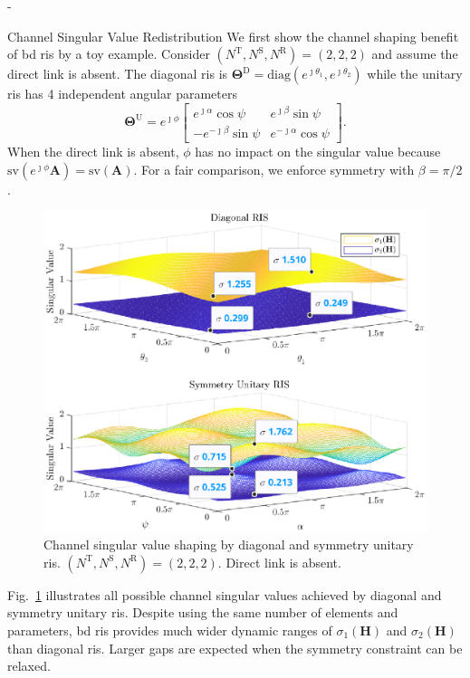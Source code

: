 \documentclass[journal]{IEEEtran}
\begin{document}
\begin{section}{-}

	\begin{subsection}{Channel Singular Value Redistribution}
		We first show the channel shaping benefit of \gls{bd} \gls{ris} by a toy example.
		Consider $(N^\mathrm{T}, N^\mathrm{S}, N^\mathrm{R}) = (2, 2, 2)$ and assume the direct link is absent.
		The diagonal \gls{ris} is $\mathbf{\Theta}^\mathrm{D} = \mathrm{diag}(e^{\jmath \theta_1}, e^{\jmath \theta_2})$ while the unitary \gls{ris} has 4 independent angular parameters
		\begin{equation}
			\mathbf{\Theta}^\mathrm{U} = e^{\jmath \phi} \begin{bmatrix}
				e^{\jmath \alpha} \cos \psi  & e^{\jmath \beta} \sin \psi   \\
				-e^{-\jmath \beta} \sin \psi & e^{-\jmath \alpha} \cos \psi
			\end{bmatrix}.
		\end{equation}
		When the direct link is absent, $\phi$ has no impact on the singular value because $\mathrm{sv}(e^{\jmath \phi} \mathbf{A}) = \mathrm{sv}(\mathbf{A})$.
		For a fair comparison, we enforce symmetry with $\beta = \pi / 2$.
		\begin{figure}
			\centering
			\includegraphics[width=\columnwidth]{assets/simulation/pc_singular_toy.eps}
			\caption{Channel singular value shaping by diagonal and symmetry unitary \gls{ris}. $(N^\mathrm{T}, N^\mathrm{S}, N^\mathrm{R}) = (2, 2, 2)$. Direct link is absent.}
			\label{sm:pc_singular_toy}
		\end{figure}
		Fig.~\ref{sm:pc_singular_toy} illustrates all possible channel singular values achieved by diagonal and symmetry unitary \gls{ris}.
		Despite using the same number of elements and parameters, \gls{bd} \gls{ris} provides much wider dynamic ranges of $\sigma_1(\mathbf{H})$ and $\sigma_2(\mathbf{H})$ than diagonal \gls{ris}.
		Larger gaps are expected when the symmetry constraint can be relaxed.


\end{subsection}
\end{section}
\end{document}
